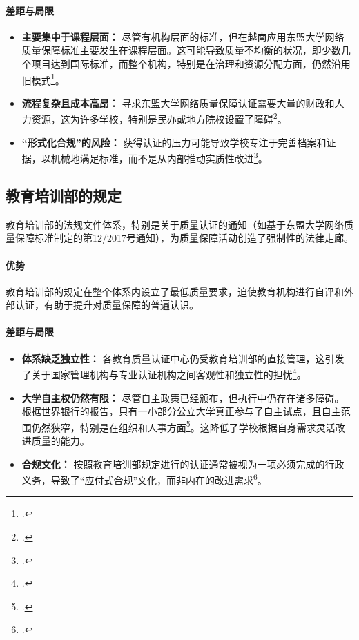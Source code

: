 \paragraph{差距与局限}
\begin{itemize}
    \item \textbf{主要集中于课程层面：} 尽管有机构层面的标准，但在越南应用东盟大学网络质量保障标准主要发生在课程层面。这可能导致质量不均衡的状况，即少数几个项目达到国际标准，而整个机构，特别是在治理和资源分配方面，仍然沿用旧模式\footcite{aun_institutional_v2}。
    \item \textbf{流程复杂且成本高昂：} 寻求东盟大学网络质量保障认证需要大量的财政和人力资源，这为许多学校，特别是民办或地方院校设置了障碍\footcite{stdjssh_637}。
    \item \textbf{“形式化合规”的风险：} 获得认证的压力可能导致学校专注于完善档案和证据，以机械地满足标准，而不是从内部推动实质性改进\footcite{pmc_article_9127449}。
\end{itemize}

\subsection{教育培训部的规定}
教育培训部的法规文件体系，特别是关于质量认证的通知（如基于东盟大学网络质量保障标准制定的第12/2017号通知），为质量保障活动创造了强制性的法律走廊。

\paragraph{优势} 教育培训部的规定在整个体系内设立了最低质量要求，迫使教育机构进行自评和外部认证，有助于提升对质量保障的普遍认识。

\paragraph{差距与局限}
\begin{itemize}
    \item \textbf{体系缺乏独立性：} 各教育质量认证中心仍受教育培训部的直接管理，这引发了关于国家管理机构与专业认证机构之间客观性和独立性的担忧\footcite{ncdt_journal_219}。
    \item \textbf{大学自主权仍然有限：} 尽管自主政策已经颁布，但执行中仍存在诸多障碍。根据世界银行的报告，只有一小部分公立大学真正参与了自主试点，且自主范围仍然狭窄，特别是在组织和人事方面\footcite{world-bank_improvingperformance}。这降低了学校根据自身需求灵活改进质量的能力。
    \item \textbf{合规文化：} 按照教育培训部规定进行的认证通常被视为一项必须完成的行政义务，导致了“应付式合规”文化，而非内在的改进需求\footcite{vjol_reactiveculture}。
\end{itemize}

